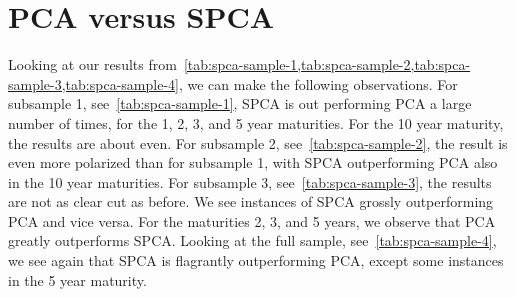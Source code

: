 \section{PCA versus SPCA}
Looking at our results from~\cref{tab:spca-sample-1,tab:spca-sample-2,tab:spca-sample-3,tab:spca-sample-4}, we can make the following observations. 
For subsample 1, see~\cref{tab:spca-sample-1}, SPCA is out performing PCA a large number of times, for the 1, 2, 3, and 5 year maturities.
For the 10 year maturity, the results are about even.
For subsample 2, see~\cref{tab:spca-sample-2}, the result is even more polarized than for subsample 1, with SPCA outperforming PCA also in the 10 year maturities.
For subsample 3, see~\cref{tab:spca-sample-3}, the results are not as clear cut as before.
We see instances of SPCA grossly outperforming PCA and vice versa. 
For the maturities 2, 3, and 5 years, we observe that PCA greatly outperforms SPCA. 
Looking at the full sample, see~\cref{tab:spca-sample-4}, we see again that SPCA is flagrantly outperforming PCA, except some instances in the 5 year maturity. 
